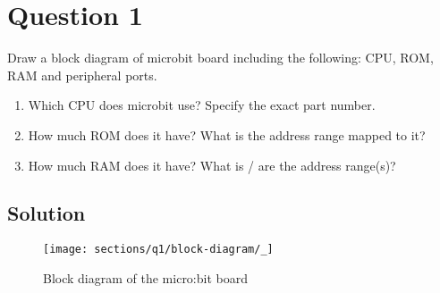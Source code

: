 \section*{Question 1}

Draw a block diagram of microbit board including the following: CPU, ROM, RAM and peripheral ports.

\begin{enumerate}[label = (\alph*)]
    \item Which CPU does microbit use? Specify the exact part number.
    \item How much ROM does it have? What is the address range mapped to it?
    \item How much RAM does it have? What is / are the address range(s)?
\end{enumerate}

\subsection*{Solution}

\begin{figure*}[htbp]
    \centering
    \texttt{[image: sections/q1/block-diagram/\_]}
    \caption{
        Block diagram of the micro:bit board
    }\label{fig:block-diagram-microbit}
\end{figure*}
